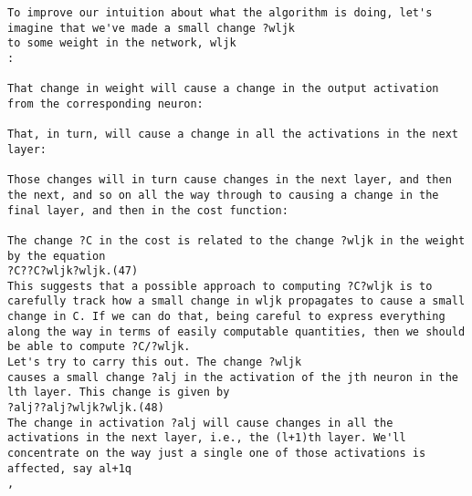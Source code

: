 \begin{lstlisting}
To improve our intuition about what the algorithm is doing, let's imagine that we've made a small change ?wljk
to some weight in the network, wljk
: 

That change in weight will cause a change in the output activation from the corresponding neuron: 

That, in turn, will cause a change in all the activations in the next layer: 

Those changes will in turn cause changes in the next layer, and then the next, and so on all the way through to causing a change in the final layer, and then in the cost function: 

The change ?C in the cost is related to the change ?wljk in the weight by the equation 
?C??C?wljk?wljk.(47)
This suggests that a possible approach to computing ?C?wljk is to carefully track how a small change in wljk propagates to cause a small change in C. If we can do that, being careful to express everything along the way in terms of easily computable quantities, then we should be able to compute ?C/?wljk.
Let's try to carry this out. The change ?wljk
causes a small change ?alj in the activation of the jth neuron in the lth layer. This change is given by 
?alj??alj?wljk?wljk.(48)
The change in activation ?alj will cause changes in all the activations in the next layer, i.e., the (l+1)th layer. We'll concentrate on the way just a single one of those activations is affected, say al+1q
, 


\end{lstlisting}
